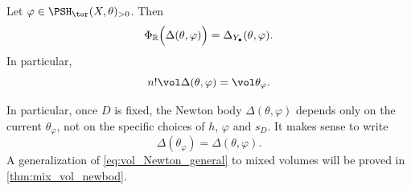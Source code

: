\begin{theorem}\label{thm:toricpob}
    Let $\varphi\in \PSH_{\tor}(X,\theta)_{>0}$. Then
    \begin{equation}\label{eq:toricOkounkovcomp}
    \Phi_{\mathbb{R}}\Bigl(  \Delta(\theta,\varphi)\Bigr)=\Delta_{Y_{\bullet}}(\theta,\varphi).
    \end{equation}
    In particular,
    \begin{equation}\label{eq:vol_Newton_general}
        n!\vol \Delta(\theta,\varphi)=\vol \theta_{\varphi}.
    \end{equation}
\end{theorem}
In particular, once $D$ is fixed, the Newton body $\Delta(\theta,\varphi)$ depends only on the current $\theta_{\varphi}$, not on the specific choices of $h$, $\varphi$ and $s_D$. It makes sense to write
\[
\Delta\left(\theta_{\varphi}\right)=\Delta(\theta,\varphi).
\]
A generalization of \eqref{eq:vol_Newton_general} to mixed volumes will be proved in \cref{thm:mix_vol_newbod}.
